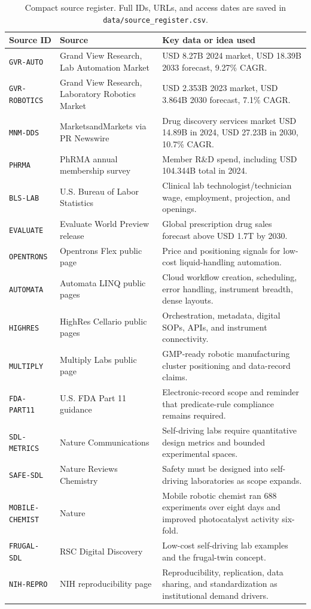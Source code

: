 \documentclass[11pt]{article}
\begin{document}
\begin{table}[H]
\centering
\scriptsize
\begin{tabularx}{\linewidth}{@{}L{3.2cm}L{3.8cm}Y@{}}
\toprule
\textbf{Source ID} & \textbf{Source} & \textbf{Key data or idea used} \\
\midrule
\texttt{GVR-AUTO} & Grand View Research, Lab Automation Market & USD 8.27B 2024 market, USD 18.39B 2033 forecast, 9.27\% CAGR. \\
\texttt{GVR-ROBOTICS} & Grand View Research, Laboratory Robotics Market & USD 2.353B 2023 market, USD 3.864B 2030 forecast, 7.1\% CAGR. \\
\texttt{MNM-DDS} & MarketsandMarkets via PR Newswire & Drug discovery services market USD 14.89B in 2024, USD 27.23B in 2030, 10.7\% CAGR. \\
\texttt{PHRMA} & PhRMA annual membership survey & Member R\&D spend, including USD 104.344B total in 2024. \\
\texttt{BLS-LAB} & U.S. Bureau of Labor Statistics & Clinical lab technologist/technician wage, employment, projection, and openings. \\
\texttt{EVALUATE} & Evaluate World Preview release & Global prescription drug sales forecast above USD 1.7T by 2030. \\
\texttt{OPENTRONS} & Opentrons Flex public page & Price and positioning signals for low-cost liquid-handling automation. \\
\texttt{AUTOMATA} & Automata LINQ public pages & Cloud workflow creation, scheduling, error handling, instrument breadth, dense layouts. \\
\texttt{HIGHRES} & HighRes Cellario public pages & Orchestration, metadata, digital SOPs, APIs, and instrument connectivity. \\
\texttt{MULTIPLY} & Multiply Labs public page & GMP-ready robotic manufacturing cluster positioning and data-record claims. \\
\texttt{FDA-PART11} & U.S. FDA Part 11 guidance & Electronic-record scope and reminder that predicate-rule compliance remains required. \\
\texttt{SDL-METRICS} & Nature Communications & Self-driving labs require quantitative design metrics and bounded experimental spaces. \\
\texttt{SAFE-SDL} & Nature Reviews Chemistry & Safety must be designed into self-driving laboratories as scope expands. \\
\texttt{MOBILE-CHEMIST} & Nature & Mobile robotic chemist ran 688 experiments over eight days and improved photocatalyst activity six-fold. \\
\texttt{FRUGAL-SDL} & RSC Digital Discovery & Low-cost self-driving lab examples and the frugal-twin concept. \\
\texttt{NIH-REPRO} & NIH reproducibility page & Reproducibility, replication, data sharing, and standardization as institutional demand drivers. \\
\bottomrule
\end{tabularx}
\caption{Compact source register. Full IDs, URLs, and access dates are saved in \texttt{data/source\_register.csv}.}
\label{tab:sources}
\end{table}
\end{document}
